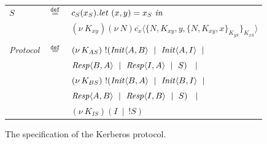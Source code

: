 \documentclass[10pt,a4paper,final,oneside,fleqn]{book}
\newcommand*{\eqdef}{\mathbin{\mathop{=}\limits^{\texttt{def}}}}
\begin{document}
\begin{figure}[!tbp]
\begin{center}
\begin{tabular}{|lll|}
$S$&$\eqdef$&$c_S(x_{S}).\mbox{{\itshape let\/} }(x,y)=x_{S}\mbox{ {\itshape in\/}}$\\ &&$(\nu~\!K_{xy})(\nu~\!N)\overline{c_{x}}\langle\{N,K_{xy},y,\{N,K_{xy},x\}_{K_{yS}}\}_{K_{xS}}\rangle$\\&&\\
{\itshape Protocol\/}&$\eqdef$&$(\nu~\!K_{AS})~!(\mbox{{\itshape Init\/}}\langle A,B\rangle~\mid~\mbox{{\itshape Init\/}}\langle A,I\rangle~\mid$\\
&&\hspace{13mm}$\mbox{{\itshape Resp\/}}\langle B,A\rangle~\mid~\mbox{{\itshape Resp\/}}\langle I,A\rangle~\mid~S)~~\mid$\\
&&$(\nu~\!K_{BS})~!(\mbox{{\itshape Init\/}}\langle B,A\rangle~\mid~\mbox{{\itshape Init\/}}\langle B,I\rangle~\mid$\\
&&\hspace{13mm}$\mbox{{\itshape Resp\/}}\langle A,B\rangle~\mid~\mbox{{\itshape Resp\/}}\langle I,B\rangle~\mid~S)~~\mid$\\
&&$(\nu~\!K_{IS})(I~\mid~!S)$\\
\hline
\end{tabular}
\end{center}
\caption{The specification of the Kerberos protocol.\label{ker}}
\end{figure}
\end{document}
